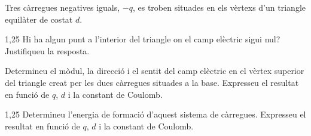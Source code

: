 Tres càrregues negatives iguals, $-q$, es troben situades en els vèrtexs d'un triangle
equilàter de costat $d$.


\begin{apartat}{1,25}
Hi ha algun punt a l'interior del triangle on el camp elèctric sigui nul? Justifiqueu la
resposta.

Determineu el mòdul, la direcció i el sentit del camp elèctric en el vèrtex superior del
triangle creat per les dues càrregues situades a la base. Expresseu el resultat en funció
de $q$, $d$ i la constant de Coulomb.
\end{apartat}

\begin{apartat}{1,25}
Determineu l'energia de formació d'aquest sistema de càrregues. Expresseu el resultat en
funció de $q$, $d$ i la constant de Coulomb.
\end{apartat}
